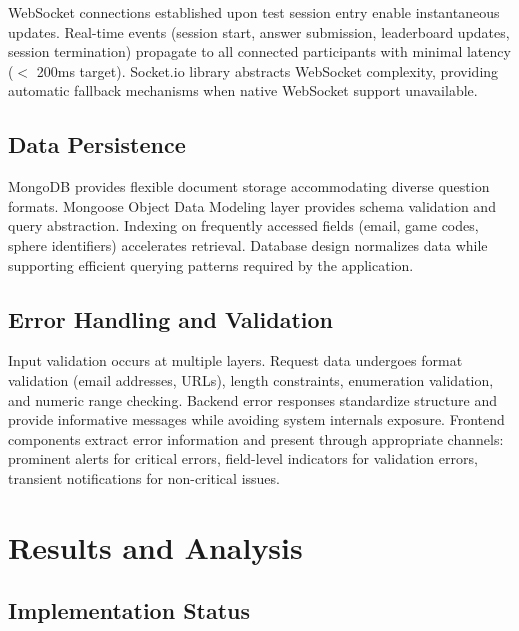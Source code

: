 \documentclass[12pt,a4paper]{report}
\begin{document}
WebSocket connections established upon test session entry enable instantaneous updates. Real-time events (session start, answer submission, leaderboard updates, session termination) propagate to all connected participants with minimal latency ($<$ 200ms target). Socket.io library abstracts WebSocket complexity, providing automatic fallback mechanisms when native WebSocket support unavailable.

\section{Data Persistence}

MongoDB provides flexible document storage accommodating diverse question formats. Mongoose Object Data Modeling layer provides schema validation and query abstraction. Indexing on frequently accessed fields (email, game codes, sphere identifiers) accelerates retrieval. Database design normalizes data while supporting efficient querying patterns required by the application.

\section{Error Handling and Validation}

Input validation occurs at multiple layers. Request data undergoes format validation (email addresses, URLs), length constraints, enumeration validation, and numeric range checking. Backend error responses standardize structure and provide informative messages while avoiding system internals exposure. Frontend components extract error information and present through appropriate channels: prominent alerts for critical errors, field-level indicators for validation errors, transient notifications for non-critical issues.

\cleardoublepage


\chapter{Results and Analysis}

\section{Implementation Status}
\end{document}
